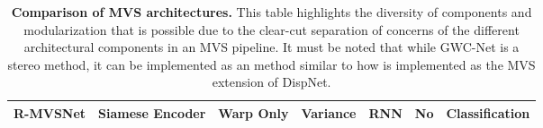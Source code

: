 \begin{table}[htbp]
\begin{tabular}{|l|l|l|l|l|l|l|}
    
\textbf{R-MVSNet}     & Siamese Encoder             & Warp Only                  & Variance                    & RNN                        & No                          & Classification     \\ \hline
\end{tabular}
\caption[Comparison of MVS architectures.]{\textbf{Comparison of MVS architectures.} This table highlights the diversity of components and modularization that is possible due to the clear-cut separation of concerns of the different architectural components in an MVS pipeline. It must be noted that while GWC-Net is a stereo method, it can be implemented as an {\mvs} method similar to how {\rmvd} is implemented as the MVS extension of DispNet. } 
\label{tab:methods-comparision}
\end{table}